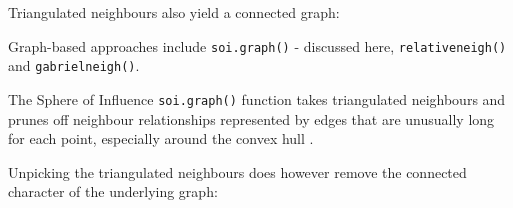 \documentclass[]{book}
\newenvironment{Shaded}{\begin{snugshade}}{\end{snugshade}}
\newcommand{\CommentTok}[1]{\textcolor[rgb]{0.56,0.35,0.01}{\textit{#1}}}
\newcommand{\KeywordTok}[1]{\textcolor[rgb]{0.13,0.29,0.53}{\textbf{#1}}}
\newcommand{\NormalTok}[1]{#1}
\newcommand{\OperatorTok}[1]{\textcolor[rgb]{0.81,0.36,0.00}{\textbf{#1}}}
\newcommand{\StringTok}[1]{\textcolor[rgb]{0.31,0.60,0.02}{#1}}
\begin{document}
\begin{Shaded}
\end{Shaded}

Triangulated neighbours also yield a connected graph:

\begin{Shaded}
\end{Shaded}

Graph-based approaches include \texttt{soi.graph()} - discussed here, \texttt{relativeneigh()} and \texttt{gabrielneigh()}.

The Sphere of Influence \texttt{soi.graph()} function takes triangulated neighbours and prunes off neighbour relationships represented by edges that are unusually long for each point, especially around the convex hull \citep{avis+horton:1985}.

\begin{Shaded}
\end{Shaded}

Unpicking the triangulated neighbours does however remove the connected character of the underlying graph:

\begin{Shaded}
\end{Shaded}
\end{document}
